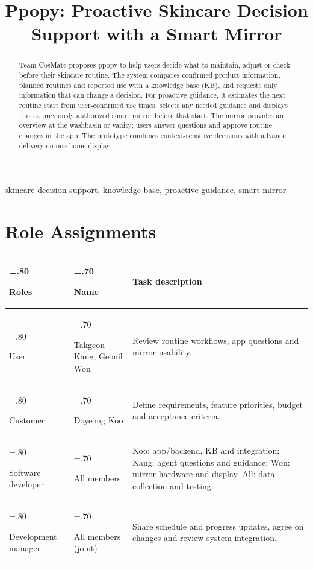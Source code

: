 \documentclass[conference,letterpaper]{IEEEtran}
\title{Ppopy: Proactive Skincare Decision Support with a Smart Mirror}
\author{\IEEEauthorblockN{Doyeong Koo, Takgeon Kang, Geonil Won}\IEEEauthorblockA{Hanyang University\\Team CosMate -- CSE406 Software Engineering}}
\begin{document}
\maketitle
\pagestyle{plain}
\thispagestyle{plain}
\begin{abstract}
Team CosMate proposes ppopy to help users decide what to maintain, adjust or check before their skincare routine. The system compares confirmed product information, planned routines and reported use with a knowledge base (KB), and requests only information that can change a decision. For proactive guidance, it estimates the next routine start from user-confirmed use times, selects any needed guidance and displays it on a previously authorized smart mirror before that start. The mirror provides an overview at the washbasin or vanity; users answer questions and approve routine changes in the app. The prototype combines context-sensitive decisions with advance delivery on one home display.
\end{abstract}
\begin{IEEEkeywords}skincare decision support, knowledge base, proactive guidance, smart mirror\end{IEEEkeywords}
\section*{Role Assignments}
{\centering\footnotesize
\renewcommand{\arraystretch}{1.12}\setlength{\tabcolsep}{3pt}
\begin{tabularx}{\columnwidth}{@{}>{\hsize=.80\hsize\raggedright\arraybackslash}X>{\hsize=.70\hsize\raggedright\arraybackslash}X>{\hsize=1.50\hsize\raggedright\arraybackslash}X@{}}\toprule
\textbf{Roles} & \textbf{Name} & \textbf{Task description}\\\midrule
User & Takgeon Kang, Geonil Won & Review routine workflows, app questions and mirror usability.\\
Customer & Doyeong Koo & Define requirements, feature priorities, budget and acceptance criteria.\\
Software developer & All members & Koo: app/backend, KB and integration; Kang: agent questions and guidance; Won: mirror hardware and display. All: data collection and testing.\\
Development manager & All members (joint) & Share schedule and progress updates, agree on changes and review system integration.\\
\bottomrule
\end{tabularx}
}
\end{document}
